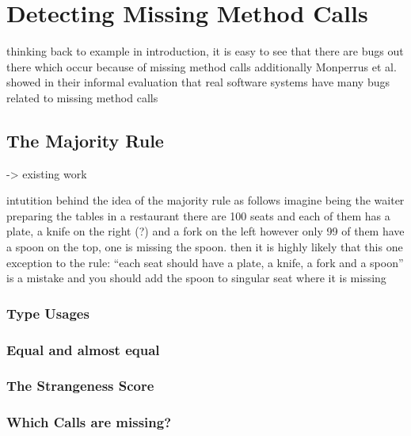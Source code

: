 \chapter{Detecting Missing Method Calls}

thinking back to example in introduction, it is easy to see that there are bugs out there which occur because of missing method calls
additionally Monperrus et al. showed in their informal evaluation that real software systems have many bugs related to missing method calls


\section{The Majority Rule}
-> existing work

intutition behind the idea of the majority rule as follows
imagine being the waiter preparing the tables in a restaurant
there are 100 seats and each of them has a plate, a knife on the right (?) and a fork on the left
however only 99 of them have a spoon on the top,
one is missing the spoon.
then it is highly likely that this one exception to the rule: ``each seat should have a plate, a knife, a fork and a spoon'' is a mistake
and you should add the spoon to singular seat where it is missing

\subsection{Type Usages}

\subsection{Equal and almost equal}

\subsection{The Strangeness Score}

\subsection{Which Calls are missing?}

